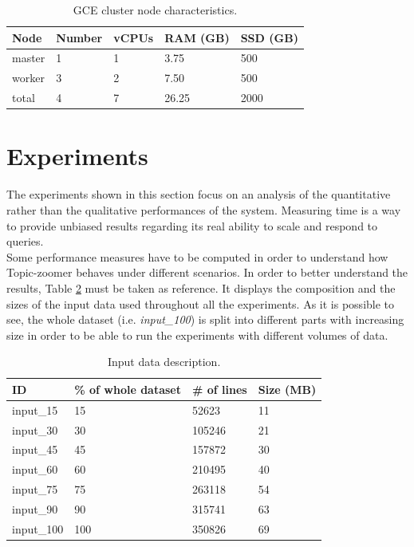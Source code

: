\documentclass{sig-alternate-05-2015}
\begin{document}
\begin{table}[]
    \centering
    \caption{GCE cluster node characteristics.}
    \label{cluster}
    \begin{tabular}{lllll}
    \hline
    Node   & Number & vCPUs & RAM (GB) & SSD (GB) \\
    \hline
    master & 1      & 1     & 3.75     & 500      \\
    worker & 3      & 2     & 7.50     & 500      \\
    \hline
    total  & 4      & 7     & 26.25    & 2000
    \end{tabular}
\end{table}


\section{Experiments}\label{experiments}
The experiments shown in this section focus on an analysis of the quantitative rather than the qualitative performances of the system. Measuring time is a way to provide unbiased results regarding its real ability to scale and respond to queries.\\
Some performance measures have to be computed in order to understand how Topic-zoomer behaves under different scenarios. In order to better understand the results, Table \ref{datasets} must be taken as reference. It displays the composition and the sizes of the input data used throughout all the experiments. As it is possible to see, the whole dataset (i.e. \emph{input\_100}) is split into different parts with increasing size in order to be able to run the experiments with different volumes of data.

\begin{table}[]
    \centering
    \caption{Input data description.}
    \label{datasets}
    \begin{tabular}{llll}
    \hline
    ID         & \% of whole dataset & \# of lines & Size (MB) \\
    \hline
    input\_15  & 15                  & 52623       & 11        \\
    input\_30  & 30                  & 105246      & 21        \\
    input\_45  & 45                  & 157872      & 30        \\
    input\_60  & 60                  & 210495      & 40        \\
    input\_75  & 75                  & 263118      & 54        \\
    input\_90  & 90                  & 315741      & 63        \\
    input\_100 & 100                 & 350826      & 69
    \end{tabular}
\end{table}
\end{document}
